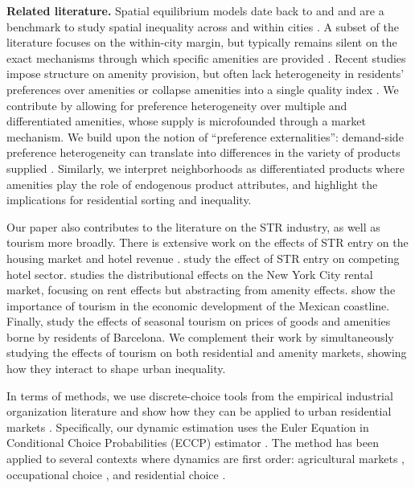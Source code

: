 \documentclass[11pt]{article}
\newcommand{\Paragraph}{\vspace{0.1cm}\noindent\textbf}
\begin{document}
\Paragraph{Related literature.} Spatial equilibrium models date back to \cite{rosen1979wage} and \cite{roback1982wages} and are a benchmark to study spatial inequality across and within cities \citep{moretti2013real, diamond16, couture2020urban}. A subset of the literature focuses on the within-city margin, but typically remains silent on the exact mechanisms through which specific amenities are provided \citep{bayer2007unified, guerrieri2013endogenous, ahlfeldt2015economics, davis2019long, su2022rising}. Recent studies impose structure on amenity provision, but often lack heterogeneity in residents' preferences over amenities or collapse amenities into a single quality index \citep{couture2021income, hoelzlein2020two, miyauchi2021consumption}. We contribute by allowing for preference heterogeneity over multiple and differentiated amenities, whose supply is microfounded through a market mechanism. We build upon the notion of ``preference externalities'': demand-side preference heterogeneity can translate into differences in the variety of products supplied \citep{george2003affects, handbury2021poor}. Similarly, we interpret neighborhoods as differentiated products where amenities play the role of endogenous product attributes, and highlight the implications for residential sorting and inequality.

Our paper also contributes to the literature on the STR industry, as well as tourism more broadly. There is extensive work on the effects of STR entry on the housing market \citep{sheppard2016airbnb, koster2021short, garcia2019short, barron2021effect} and hotel revenue \citep{zervas2017rise}. \cite{farronato2018welfare} study the effect of STR entry on competing hotel sector. \cite{calder2021distributional} studies the distributional effects on the New York City rental market, focusing on rent effects but abstracting from amenity effects. \cite{faber2019tourism} show the importance of tourism in the economic development of the Mexican coastline. Finally, \cite{allen2021tourism} study the effects of seasonal tourism on prices of goods and amenities borne by residents of Barcelona. We complement their work by simultaneously studying the effects of tourism on both residential and amenity markets, showing how they interact to shape urban inequality.

In terms of methods, we use discrete-choice tools from the empirical industrial organization literature and show how they can be applied to urban residential markets \citep{mcfadden1974measurement, berry1994estimating, berry1995automobile, rust1987optimal}. Specifically, our dynamic estimation uses the Euler Equation in Conditional Choice Probabilities (ECCP) estimator \citep{hotz1993conditional, arcidiacono2011conditional, aguirregabiria2013euler, scott2013dynamic, kalouptsidi2021linear}. The method has been applied to several contexts where dynamics are first order: agricultural markets \citep{scott2013dynamic, hsiao2021coordination}, occupational choice \citep{traiberman2019occupations, humlum2021robot}, and residential choice \citep{diamond2019effects, davis2019long, davis2021neighborhood}.
\end{document}
